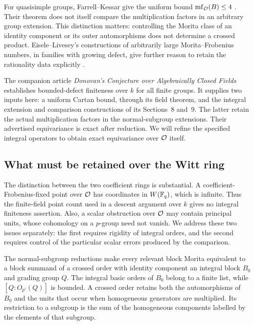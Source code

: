 For quasisimple groups, Farrell--Kessar give the uniform bound
$\operatorname{mf}_{\mathcal O}(B)\leq4$ \cite[Theorem~1.1]{FarrellKessar2019}.
Their theorem does not itself compare the multiplication factors in
an arbitrary group extension.  This distinction matters: controlling
the Morita class of an identity component or its outer automorphisms
does not determine a crossed product.  Eisele--Livesey's constructions
of arbitrarily large Morita--Frobenius numbers, in families with
growing defect, give further reason to retain the rationality data
explicitly \cite{EiseleLivesey2022}.

The companion article \emph{Donovan's Conjecture over Algebraically
Closed Fields} \cite{OpenAIFieldDonovan2026} establishes
bounded-defect finiteness over $k$ for all finite groups.  It supplies
two inputs here: a uniform Cartan bound, through its field theorem,
and the integral extension and comparison constructions of its
Sections~8 and~9.  The latter retain the actual multiplication factors
in the normal-subgroup extensions.  Their advertised equivariance
is exact after reduction.  We will refine the specified integral
operators to obtain exact equivariance over $\mathcal O$ itself.

\subsection{What must be retained over the Witt ring}

The distinction between the two coefficient rings is substantial.
A coefficient-Frobenius-fixed point over $\mathcal O$ has coordinates in
$W(\mathbb F_q)$, which is infinite.  Thus the finite-field point count used
in a descent argument over $k$ gives no integral finiteness assertion.
Also, a scalar obstruction over $\mathcal O$ may contain principal units,
whose cohomology on a $p$-group need not vanish.  We address these
two issues separately: the first requires rigidity of integral
orders, and the second requires control of the particular scalar
errors produced by the comparison.

The normal-subgroup reductions make every relevant block Morita
equivalent to a block summand of a crossed order with identity
component an integral
block $B_0$ and grading group $Q$.  The integral basic orders of $B_0$
belong to a finite list, while $[Q:O_{p'}(Q)]$ is bounded.  A crossed
order retains both the automorphisms of $B_0$ and the units that occur
when homogeneous generators are multiplied.  Its restriction to a
subgroup is the sum of the homogeneous components labelled by the
elements of that subgroup.

